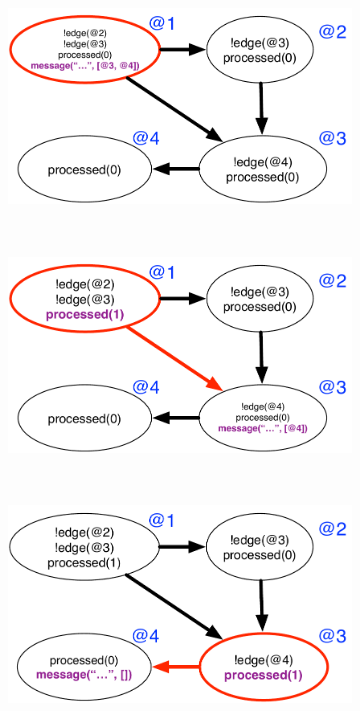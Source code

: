 \newcommand{\visitsize}{0.38}

\begin{figure}[h]
        \centering
        \begin{subfigure}[b]{\visitsize\textwidth}
                \includegraphics[width=\textwidth]{figures/message/message_trace1}
                \label{fig:message_trace1}
        \end{subfigure}%
        ~
        \begin{subfigure}[b]{\visitsize\textwidth}
                \includegraphics[width=\textwidth]{figures/message/message_trace2}
                \label{fig:message_trace2}
        \end{subfigure}\\
        \begin{subfigure}[b]{\visitsize\textwidth}
                \includegraphics[width=\textwidth]{figures/message/message_trace3}

\end{subfigure}
\end{figure}

